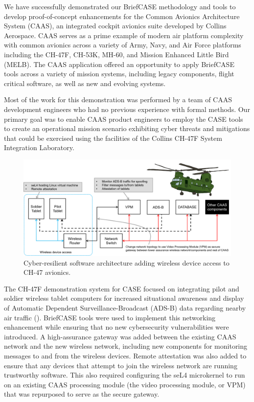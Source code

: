 We have successfully demonstrated our BriefCASE methodology and tools to
develop proof-of-concept enhancements for the Common Avionics
Architecture System (CAAS), an integrated cockpit avionics suite developed by Collins Aerospace. 
CAAS serves as a prime example of modern air platform complexity with common avionics across a variety of
Army, Navy, and Air Force platforms including the CH-47F, CH-53K, MH-60, and Mission Enhanced Little Bird (MELB). 
The CAAS application offered an opportunity to
apply BriefCASE tools across a variety of mission systems, including legacy components, flight critical
software, as well as new and evolving systems.

Most of the work for this demonstration was 
performed by a team of CAAS development engineers who had no
previous experience with formal methods.
Our primary goal was to enable CAAS product engineers to employ the CASE tools to create an
operational mission scenario exhibiting cyber threats and mitigations that could be exercised using
the facilities of the Collins CH-47F System Integration Laboratory. 

\begin{figure}
	\begin{center}
	\includegraphics[width=\textwidth]{./figs/caas-arch.png}
        \end{center}
	\caption{Cyber-resilient software architecture adding wireless device access to CH-47 avionics.} 
	\label{fig:caas-arch} 
\end{figure}

The CH-47F demonstration system
for CASE focused on integrating pilot and soldier wireless tablet computers for
increased situational awareness and display of Automatic Dependent Surveillance-Broadcast (ADS-B)
data regarding nearby air traffic ().  
BriefCASE tools were used to implement this networking enhancement while ensuring that no new cybersecurity
vulnerabilities were introduced.  A high-assurance gateway was added between the existing CAAS 
network and the new wireless network, including new components for monitoring messages to and from the wireless 
devices.  Remote attestation was also added to ensure that any devices that attempt to join the wireless network
are running trustworthy software.   
This also required configuring the seL4 microkernel to run on an existing CAAS
processing module (the video processing module, or VPM) that was repurposed to serve as the secure gateway.  


